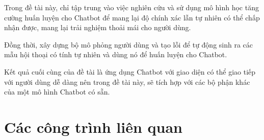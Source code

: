 Trong đề tài này, chỉ tập trung vào việc nghiên cứu và sử dụng
mô hình học tăng cường huấn luyện cho Chatbot để mang lại độ
chính xác lẫn tự nhiên có thể chấp nhận được, mang lại
trải nghiệm thoải mái cho người dùng.

Đồng thời, xây dựng bộ mô phỏng người dùng và tạo lỗi để tự động
sinh ra các mẫu hội thoại có tính tự nhiên và dùng nó để
huấn luyện cho Chatbot.

Kết quả cuối cùng của đề tài là ứng dụng Chatbot với giao diện
có thể giao tiếp với người dùng dễ dàng nên trong đề tài này,
sẽ tích hợp với các bộ phận khác của một mô hình Chatbot có sẵn.

\section{Các công trình liên quan}
